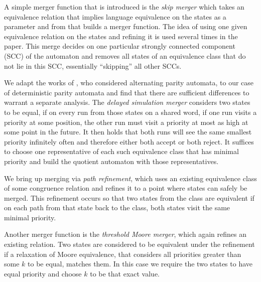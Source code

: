 A simple merger function that is introduced is the \emph{skip merger} which takes an equivalence relation that implies language equivalence on the states as a parameter and from that builds a merger function. The idea of using one given equivalence relation on the states and refining it is used several times in the paper. This merge decides on one particular strongly connected component (SCC) of the automaton and removes all states of an equivalence class that do not lie in this SCC, essentially \enquote{skipping} all other SCCs.

We adapt the works of \cite{FritzWilke06}, who considered alternating parity automata, to our case of deterministic parity automata and find that there are sufficient differences to warrant a separate analysis. The \emph{delayed simulation merger} considers two states to be equal, if on every run from those states on a shared word, if one run visits a priority at some position, the other run must visit a priority at most as high at some point in the future. It then holds that both runs will see the same smallest priority infinitely often and therefore either both accept or both reject. It suffices to choose one representative of each such equivalence class that has minimal priority and build the quotient automaton with those representatives.


We bring up merging via \emph{path refinement}, which uses an existing equivalence class of some congruence relation and refines it to a point where states can safely be merged. This refinement occurs so that two states from the class are equivalent if on each path from that state back to the class, both states visit the same minimal priority. 

Another merger function is the \emph{threshold Moore merger}, which again refines an existing relation. Two states are considered to be equivalent under the refinement if a relaxation of Moore equivalence, that considers all priorities greater than some $k$ to be equal, matches them. In this case we require the two states to have equal priority and choose $k$ to be that exact value.

